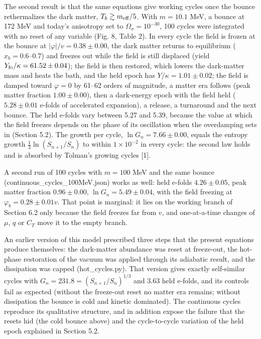 \documentclass[pdflatex,sn-mathphys-num]{sn-jnl}
\begin{document}
The second result is that the same equations give working cycles once the bounce rethermalizes the dark matter, $T_b\gtrsim m_{\rm eff}/5$. With $m=10.1$ MeV, a bounce at 172 MeV and today's anisotropy set to $\Omega_\sigma=10^{-30}$, 100 cycles were integrated with no reset of any variable (Fig. 8, Table 2). In every cycle the field is frozen at the bounce at $|\varphi|/v=0.38\pm0.00$, the dark matter returns to equilibrium ($x_b=0.6$--$0.7$) and freezes out while the field is still displaced (yield $Y_{\rm fo}/\kappa=61.52\pm0.04$); the field is then restored, which lowers the dark-matter mass and heats the bath, and the held epoch has $Y/\kappa=1.01\pm0.02$; the field is damped toward $\varphi=0$ by 61--62 orders of magnitude, a matter era follows (peak matter fraction $1.00\pm0.00$), then a dark-energy epoch with the field held ($5.28\pm0.01$ e-folds of accelerated expansion), a release, a turnaround and the next bounce. The held e-folds vary between 5.27 and 5.39, because the value at which the field freezes depends on the phase of its oscillation when the overdamping sets in (Section 5.2). The growth per cycle, $\ln G_n=7.66\pm0.00$, equals the entropy growth $\frac{1}{3}\ln(S_{n+1}/S_n)$ to within $1\times10^{-2}$ in every cycle: the second law holds and is absorbed by Tolman's growing cycles [1].

A second run of 100 cycles with $m=100$ MeV and the same bounce (continuous\_cycles\_100MeV.json) works as well: held e-folds $4.26\pm0.05$, peak matter fraction $0.96\pm0.00$, $\ln G_n=5.49\pm0.04$, with the field freezing at $\varphi_b=0.28\pm0.01v$. That point is marginal: it lies on the working branch of Section 6.2 only because the field freezes far from $v$, and one-at-a-time changes of $\mu$, $q$ or $C_T$ move it to the empty branch.

An earlier version of this model prescribed three steps that the present equations produce themselves: the dark-matter abundance was reset at freeze-out, the hot-phase restoration of the vacuum was applied through its adiabatic result, and the dissipation was capped (hot\_cycles.py). That version gives exactly self-similar cycles with $G_n=231.8=(S_{n+1}/S_n)^{1/3}$ and 3.63 held e-folds, and its controls fail as expected (without the freeze-out reset no matter era remains; without dissipation the bounce is cold and kinetic dominated). The continuous cycles reproduce its qualitative structure, and in addition expose the failure that the resets hid (the cold bounce above) and the cycle-to-cycle variation of the held epoch explained in Section 5.2.
\end{document}
